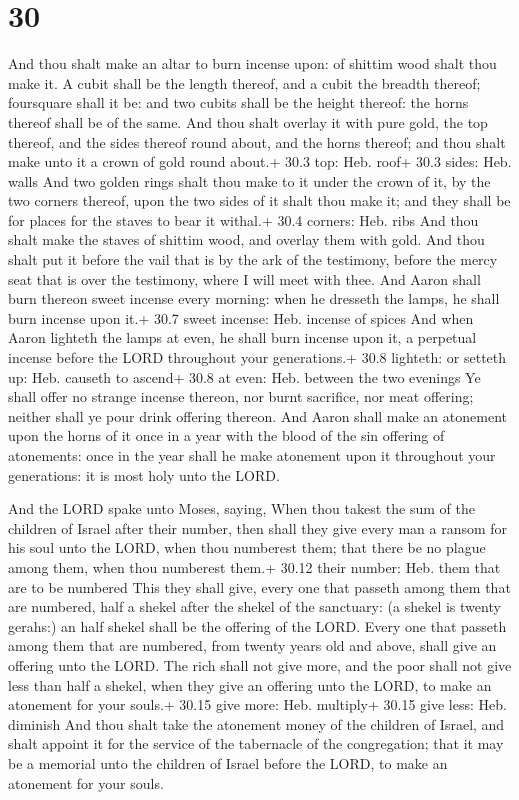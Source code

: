 \hypertarget{section-29}{%
\section{30}\label{section-29}}

 And thou shalt make an altar to burn incense upon: of
shittim wood shalt thou make it.  A cubit shall be the
length thereof, and a cubit the breadth thereof; foursquare shall it be:
and two cubits shall be the height thereof: the horns thereof shall be
of the same.  And thou shalt overlay it with pure gold, the
top thereof, and the sides thereof round about, and the horns thereof;
and thou shalt make unto it a crown of gold round about.+ 30.3 top: Heb.
roof+ 30.3 sides: Heb. walls  And two golden rings shalt
thou make to it under the crown of it, by the two corners thereof, upon
the two sides of it shalt thou make it; and they shall be for places for
the staves to bear it withal.+ 30.4 corners: Heb. ribs  And
thou shalt make the staves of shittim wood, and overlay them with gold.
 And thou shalt put it before the vail that is by the ark of
the testimony, before the mercy seat that is over the testimony, where I
will meet with thee.  And Aaron shall burn thereon sweet
incense every morning: when he dresseth the lamps, he shall burn incense
upon it.+ 30.7 sweet incense: Heb. incense of spices  And
when Aaron lighteth the lamps at even, he shall burn incense upon it, a
perpetual incense before the LORD throughout your generations.+ 30.8
lighteth: or setteth up: Heb. causeth to ascend+ 30.8 at even: Heb.
between the two evenings  Ye shall offer no strange incense
thereon, nor burnt sacrifice, nor meat offering; neither shall ye pour
drink offering thereon.  And Aaron shall make an atonement
upon the horns of it once in a year with the blood of the sin offering
of atonements: once in the year shall he make atonement upon it
throughout your generations: it is most holy unto the LORD.

 And the LORD spake unto Moses, saying, 
When thou takest the sum of the children of Israel after their number,
then shall they give every man a ransom for his soul unto the LORD, when
thou numberest them; that there be no plague among them, when thou
numberest them.+ 30.12 their number: Heb. them that are to be numbered
 This they shall give, every one that passeth among them
that are numbered, half a shekel after the shekel of the sanctuary: (a
shekel is twenty gerahs:) an half shekel shall be the offering of the
LORD.  Every one that passeth among them that are numbered,
from twenty years old and above, shall give an offering unto the LORD.
 The rich shall not give more, and the poor shall not give
less than half a shekel, when they give an offering unto the LORD, to
make an atonement for your souls.+ 30.15 give more: Heb. multiply+ 30.15
give less: Heb. diminish  And thou shalt take the atonement
money of the children of Israel, and shalt appoint it for the service of
the tabernacle of the congregation; that it may be a memorial unto the
children of Israel before the LORD, to make an atonement for your souls.

